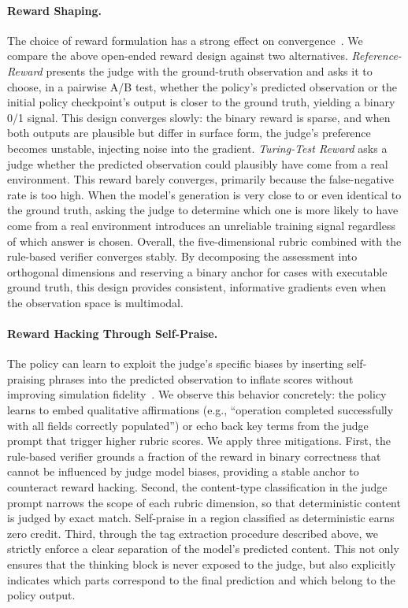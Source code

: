 \paragraph{Reward Shaping.}
The choice of reward formulation has a strong effect on convergence~\citep{zhu2025planner}.
We compare the above open-ended reward design against two alternatives.
\emph{Reference-Reward} presents the judge with the ground-truth observation and asks it to choose, in a pairwise A/B test, whether the policy's predicted observation or the initial policy checkpoint's output is closer to the ground truth, yielding a binary 0/1 signal. This design converges slowly: the binary reward is sparse, and when both outputs are plausible but differ in surface form, the judge's preference becomes unstable, injecting noise into the gradient.
\emph{Turing-Test Reward} asks a judge whether the predicted observation could plausibly have come from a real environment.
This reward barely converges, primarily because the false-negative rate is too high.
When the model's generation is very close to or even identical to the ground truth, asking the judge to determine which one is more likely to have come from a real environment introduces an unreliable training signal regardless of which answer is chosen.
Overall, the five-dimensional rubric combined with the rule-based verifier converges stably.
By decomposing the assessment into orthogonal dimensions and reserving a binary anchor for cases with executable ground truth, this design provides consistent, informative gradients even when the observation space is multimodal.

\paragraph{Reward Hacking Through Self-Praise.}
The policy can learn to exploit the judge's specific biases by inserting self-praising phrases into the predicted observation to inflate scores without improving simulation fidelity~\citep{wang2026reward}.
We observe this behavior concretely: the policy learns to embed qualitative affirmations (e.g., ``operation completed successfully with all fields correctly populated'') or echo back key terms from the judge prompt that trigger higher rubric scores.
We apply three mitigations.
First, the rule-based verifier grounds a fraction of the reward in binary correctness that cannot be influenced by judge model biases, providing a stable anchor to counteract reward hacking.
Second, the content-type classification in the judge prompt narrows the scope of each rubric dimension, so that deterministic content is judged by exact match. Self-praise in a region classified as deterministic earns zero credit.
Third, through the tag extraction procedure described above, we strictly enforce a clear separation of the model’s predicted content.
This not only ensures that the thinking block is never exposed to the judge, but also explicitly indicates which parts correspond to the final prediction and which belong to the policy output.

